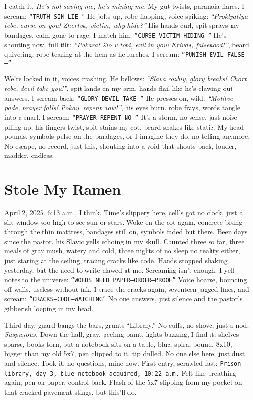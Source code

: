 \documentclass[12pt]{article}
\newcommand{\note}[1]{\texttt{#1}}
\begin{document}
I catch it. \textit{He’s not saving me, he’s mining me.} My gut twists, paranoia flares. I scream: \note{“TRUTH—SIN—LIE—”} He jolts up, robe flapping, voice spiking: \textit{“Proklyattya tebe, curse on you! Zhertva, victim, why hide?”} His hands curl, spit sprays my bandages, calm gone to rage. I match him: \note{“CURSE—VICTIM—HIDING—”} He’s shouting now, full tilt: \textit{“Pokara! Zlo v tobi, evil in you! Krivda, falsehood!”}, beard quivering, robe tearing at the hem as he lurches. I scream: \note{“PUNISH—EVIL—FALSE—”}

We’re locked in it, voices crashing. He bellows: \textit{“Slava rozbiy, glory breaks! Chort tebe, devil take you!”}, spit lands on my arm, hands flail like he’s clawing out answers. I scream back: \note{“GLORY—DEVIL—TAKE—”} He presses on, wild: \textit{“Molitva pade, prayer falls! Pokay, repent now!”}, his eyes burn, robe frays, words tangle into a snarl. I scream: \note{“PRAYER—REPENT—NO—”} It’s a storm, no sense, just noise piling up, his fingers twist, spit stains my cot, beard shakes like static. My head pounds, symbols pulse on the bandages, or I imagine they do, no telling anymore. No escape, no record, just this, shouting into a void that shouts back, louder, madder, endless.

\section{Stole My Ramen}

April 2, 2025. 6:13 a.m., I think. Time’s slippery here, cell’s got no clock, just a slit window too high to see sun or stars. Woke on the cot again, concrete biting through the thin mattress, bandages still on, symbols faded but there. Been days since the pastor, his Slavic yells echoing in my skull. Counted three so far, three meals of gray mush, watery and cold, three nights of no sleep no reality either, just staring at the ceiling, tracing cracks like code. Hands stopped shaking yesterday, but the need to write clawed at me.  Screaming isn’t enough. I yell notes to the universe: \note{“WORDS NEED PAPER—ORDER—PROOF”} Voice hoarse, bouncing off walls, useless without ink. I trace the cracks again, seventeen jagged lines, and scream: \note{“CRACKS—CODE—WATCHING”} No one answers, just silence and the pastor’s gibberish looping in my head.

Third day, guard bangs the bars, grunts “Library.” No cuffs, no shove, just a nod. \textit{Suspicious.} Down the hall, gray, peeling paint, lights buzzing, I find it: shelves sparse, books torn, but a notebook sits on a table, blue, spiral-bound, 8x10, bigger than my old 5x7, pen clipped to it, tip dulled. No one else here, just dust and silence. Took it, no questions, mine now. First entry, scrawled fast: \note{Prison library, day 3, blue notebook acquired, 10:22 a.m.} Felt like breathing again, pen on paper, control back. Flash of the 5x7 slipping from my pocket on that cracked pavement stings, but this’ll do.
\end{document}
